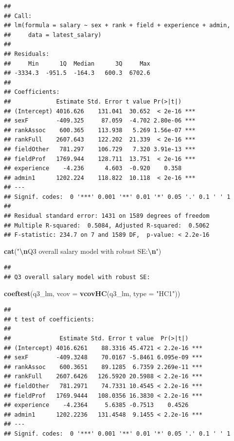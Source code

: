 \documentclass[
]{article}
\newenvironment{Shaded}{\begin{snugshade}}{\end{snugshade}}
\newcommand{\AttributeTok}[1]{\textcolor[rgb]{0.13,0.29,0.53}{#1}}
\newcommand{\FunctionTok}[1]{\textcolor[rgb]{0.13,0.29,0.53}{\textbf{#1}}}
\newcommand{\NormalTok}[1]{#1}
\newcommand{\SpecialCharTok}[1]{\textcolor[rgb]{0.81,0.36,0.00}{\textbf{#1}}}
\newcommand{\StringTok}[1]{\textcolor[rgb]{0.31,0.60,0.02}{#1}}
\begin{document}
\begin{verbatim}
## 
## Call:
## lm(formula = salary ~ sex + rank + field + experience + admin, 
##     data = latest_salary)
## 
## Residuals:
##     Min      1Q  Median      3Q     Max 
## -3334.3  -951.5  -164.3   600.3  6702.6 
## 
## Coefficients:
##             Estimate Std. Error t value Pr(>|t|)    
## (Intercept) 4016.626    131.041  30.652  < 2e-16 ***
## sexF        -409.325     87.059  -4.702 2.80e-06 ***
## rankAssoc    600.365    113.938   5.269 1.56e-07 ***
## rankFull    2607.643    122.202  21.339  < 2e-16 ***
## fieldOther   781.297    106.729   7.320 3.91e-13 ***
## fieldProf   1769.944    128.711  13.751  < 2e-16 ***
## experience    -4.236      4.603  -0.920    0.358    
## admin1      1202.224    118.822  10.118  < 2e-16 ***
## ---
## Signif. codes:  0 '***' 0.001 '**' 0.01 '*' 0.05 '.' 0.1 ' ' 1
## 
## Residual standard error: 1431 on 1589 degrees of freedom
## Multiple R-squared:  0.5084, Adjusted R-squared:  0.5062 
## F-statistic: 234.7 on 7 and 1589 DF,  p-value: < 2.2e-16
\end{verbatim}

\begin{Shaded}
\begin{Highlighting}[]
\FunctionTok{cat}\NormalTok{(}\StringTok{"}\SpecialCharTok{\textbackslash{}n}\StringTok{Q3 overall salary model with robust SE:}\SpecialCharTok{\textbackslash{}n}\StringTok{"}\NormalTok{)}
\end{Highlighting}
\end{Shaded}

\begin{verbatim}
## 
## Q3 overall salary model with robust SE:
\end{verbatim}

\begin{Shaded}
\begin{Highlighting}[]
\FunctionTok{coeftest}\NormalTok{(q3\_lm, }\AttributeTok{vcov =} \FunctionTok{vcovHC}\NormalTok{(q3\_lm, }\AttributeTok{type =} \StringTok{"HC1"}\NormalTok{))}
\end{Highlighting}
\end{Shaded}

\begin{verbatim}
## 
## t test of coefficients:
## 
##              Estimate Std. Error t value  Pr(>|t|)    
## (Intercept) 4016.6261    88.3316 45.4721 < 2.2e-16 ***
## sexF        -409.3248    70.0167 -5.8461 6.095e-09 ***
## rankAssoc    600.3651    89.1285  6.7359 2.269e-11 ***
## rankFull    2607.6426   126.5920 20.5988 < 2.2e-16 ***
## fieldOther   781.2971    74.7331 10.4545 < 2.2e-16 ***
## fieldProf   1769.9444   108.0356 16.3830 < 2.2e-16 ***
## experience    -4.2364     5.6385 -0.7513    0.4526    
## admin1      1202.2236   131.4548  9.1455 < 2.2e-16 ***
## ---
## Signif. codes:  0 '***' 0.001 '**' 0.01 '*' 0.05 '.' 0.1 ' ' 1
\end{verbatim}
\end{document}
